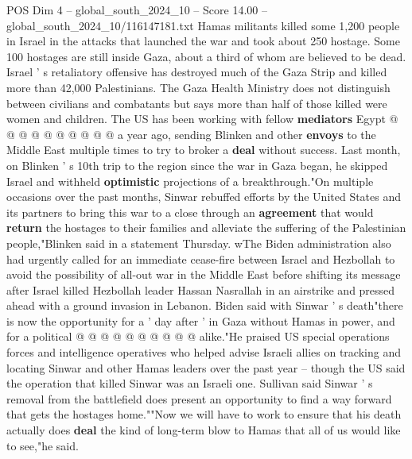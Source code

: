 \begin{textsample}{POS Dim 4 – global\_south\_2024\_10 – Score 14.00 – global\_south\_2024\_10/116147181.txt}
Hamas militants killed some 1,200 people in Israel in the attacks that launched the war and took about 250 hostage.
Some 100 hostages are still inside Gaza, about a third of whom are believed to be dead.
Israel ' s retaliatory offensive has destroyed much of the Gaza Strip and killed more than 42,000 Palestinians.
The Gaza Health Ministry does not distinguish between civilians and combatants but says more than half of those killed were women and children.
The US has been working with fellow \textbf{mediators} Egypt @ @ @ @ @ @ @ @ @ @ a year ago, sending Blinken and other \textbf{envoys} to the Middle East multiple times to try to broker a \textbf{deal} without success.
Last month, on Blinken ' s 10th trip to the region since the war in Gaza began, he skipped Israel and withheld \textbf{optimistic} projections of a breakthrough."On multiple occasions over the past months, Sinwar rebuffed efforts by the United States and its partners to bring this war to a close through an \textbf{agreement} that would \textbf{return} the hostages to their families and alleviate the suffering of the Palestinian people,"Blinken said in a statement Thursday. wThe Biden administration also had urgently called for an immediate cease-fire between Israel and Hezbollah to avoid the possibility of all-out war in the Middle East before shifting its message after Israel killed Hezbollah leader Hassan Nasrallah in an airstrike and pressed ahead with a ground invasion in Lebanon.
Biden said with Sinwar ' s death"there is now the opportunity for a ' day after ' in Gaza without Hamas in power, and for a political @ @ @ @ @ @ @ @ @ @ alike."He praised US special operations forces and intelligence operatives who helped advise Israeli allies on tracking and locating Sinwar and other Hamas leaders over the past year -- though the US said the operation that killed Sinwar was an Israeli one.
Sullivan said Sinwar ' s removal from the battlefield does present an opportunity to find a way forward that gets the hostages home.""Now we will have to work to ensure that his death actually does \textbf{deal} the kind of long-term blow to Hamas that all of us would like to see,"he said.

\end{textsample}

